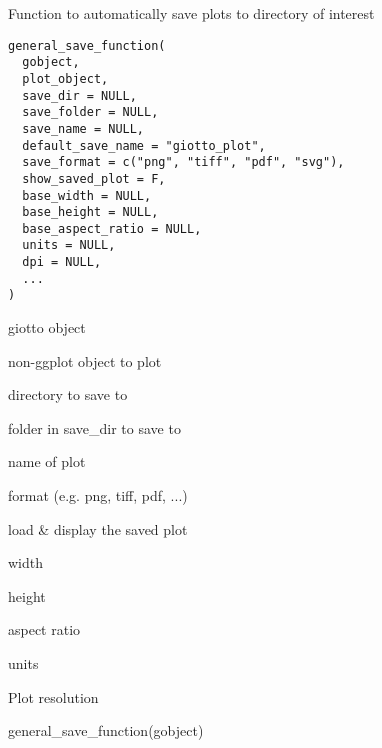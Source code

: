 \documentclass[a4paper]{book}
\begin{document}
%
\begin{Description}\relax
Function to automatically save plots to directory of interest
\end{Description}
%
\begin{Usage}
\begin{verbatim}
general_save_function(
  gobject,
  plot_object,
  save_dir = NULL,
  save_folder = NULL,
  save_name = NULL,
  default_save_name = "giotto_plot",
  save_format = c("png", "tiff", "pdf", "svg"),
  show_saved_plot = F,
  base_width = NULL,
  base_height = NULL,
  base_aspect_ratio = NULL,
  units = NULL,
  dpi = NULL,
  ...
)
\end{verbatim}
\end{Usage}
%
\begin{Arguments}
\begin{ldescription}
\item[\code{gobject}] giotto object

\item[\code{plot\_object}] non-ggplot object to plot

\item[\code{save\_dir}] directory to save to

\item[\code{save\_folder}] folder in save\_dir to save to

\item[\code{save\_name}] name of plot

\item[\code{save\_format}] format (e.g. png, tiff, pdf, ...)

\item[\code{show\_saved\_plot}] load \& display the saved plot

\item[\code{base\_width}] width

\item[\code{base\_height}] height

\item[\code{base\_aspect\_ratio}] aspect ratio

\item[\code{units}] units

\item[\code{dpi}] Plot resolution
\end{ldescription}
\end{Arguments}
%
\begin{Examples}
\begin{ExampleCode}
    general_save_function(gobject)
\end{ExampleCode}
\end{Examples}
\end{document}
